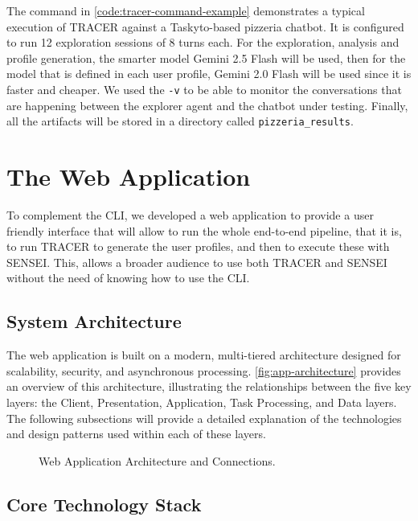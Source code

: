 The command in \autoref{code:tracer-command-example}
demonstrates a typical execution of \ac{TRACER} against a Taskyto-based pizzeria chatbot.
It is configured to run 12 exploration sessions of 8 turns each.
For the exploration, analysis and profile generation, the smarter model Gemini 2.5 Flash will be used,
then for the model that is defined in each user profile, Gemini 2.0 Flash will be used since it is faster and cheaper.
We used the \texttt{-v} to be able to monitor the conversations that are happening
between the explorer agent and the chatbot under testing.
Finally, all the artifacts will be stored in a directory called \texttt{pizzeria\_results}.

\section{The Web Application}

To complement the \ac{CLI},
we developed a web application
to provide a user friendly interface that will allow to run the whole end-to-end pipeline,
that it is, to run \ac{TRACER} to generate the user profiles,
and then to execute these with SENSEI.
This, allows a broader audience to use both \ac{TRACER} and SENSEI
without the need of knowing how to use the \ac{CLI}.

\subsection{System Architecture}

The web application is built on a modern,
multi-tiered architecture designed for scalability, security, and asynchronous processing.
\autoref{fig:app-architecture} provides an overview of this architecture,
illustrating the relationships between the five key layers:
the Client, Presentation, Application, Task Processing, and Data layers.
The following subsections will provide a detailed explanation
of the technologies and design patterns used within each of these layers.

\begin{figure}[!htbp]
    \centering
    
    \caption{Web Application Architecture and Connections.}
    \label{fig:app-architecture}
\end{figure}

\subsection{Core Technology Stack}

